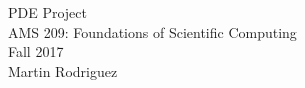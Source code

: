 \documentclass[12pt]{article}
\begin{document}
\begin{center}
	{\LARGE PDE Project} \\[10pt] 
	AMS 209: Foundations of Scientific Computing\\
	Fall 2017 \\
	{Martin Rodriguez} \\
\end{center}
\end{document}
